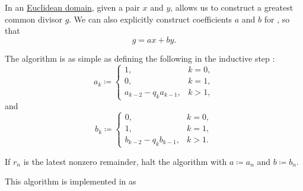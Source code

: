 \begin{algorithm}\label{alg:extended_euclidean_algorithm}
  In an \hyperref[def:euclidean_domain]{Euclidean domain}, given a pair \( x \) and \( y \),  allows us to construct a greatest common divisor \( g \). We can also explicitly construct coefficients \( a \) and \( b \) for , so that
  \begin{equation*}
    g = ax + by.
  \end{equation*}

  The algorithm is as simple as defining the following in the inductive step :
  \begin{equation*}
    a_k \coloneqq \begin{cases}
      1,                     &k = 0, \\
      0,                     &k = 1, \\
      a_{k-2} - q_k a_{k-1}, &k > 1,
    \end{cases}
  \end{equation*}
  and
  \begin{equation*}
    b_k \coloneqq \begin{cases}
      0,                     &k = 0, \\
      1,                     &k = 1, \\
      b_{k-2} - q_k b_{k-1}, &k > 1.
    \end{cases}
  \end{equation*}

  If \( r_n \) is the latest nonzero remainder, halt the algorithm with \( a \coloneqq a_n \) and \( b \coloneqq b_n \).
\end{algorithm}
\begin{comments}
  \item This algorithm is implemented in \cite{notebook:code} as
  \begin{CodeRefDisplay}
  \end{CodeRefDisplay}
\end{comments}
